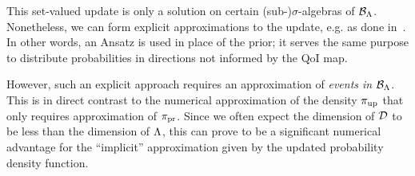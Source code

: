 This set-valued update is only a solution on certain (sub-)$\sigma$-algebras of $\mathcal{B}_{{\Lambda}}$. 
Nonetheless, we can form explicit approximations to the update, e.g. as done in~\cite{BET+14, BES12, BBE11}. 
In other words, an Ansatz is used in place of the prior; it serves the same purpose to distribute probabilities in directions not informed by the QoI map.

However, such an explicit approach requires an approximation of \emph{events in $\mathcal{B}_{{\Lambda}}$}. 
This is in direct contrast to the numerical approximation of the density $\operatorname*{\pi_{up}}$ that only requires approximation of $\operatorname*{\pi_{pr}}$.
Since we often expect the dimension of $\mathcal{D}$ to be less than the dimension of ${\Lambda}$, this can prove to be a significant numerical advantage for the ``implicit'' approximation given by the updated probability density function. 